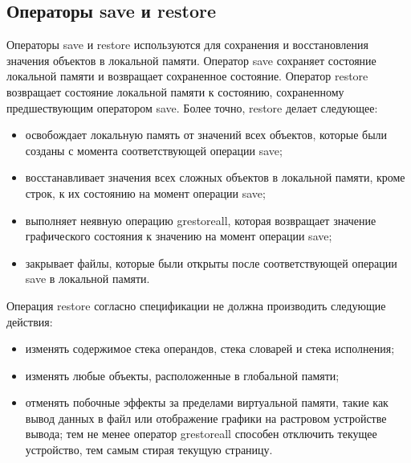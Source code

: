 \subsection{Операторы save и restore}
Операторы save и restore используются для сохранения и восстановления значения объектов в локальной памяти. Оператор save сохраняет состояние локальной памяти и возвращает сохраненное состояние. Оператор restore возвращает состояние локальной памяти к состоянию, сохраненному предшествующим оператором save. Более точно, restore делает следующее:
\begin{itemize}
\item освобождает локальную память от значений всех объектов, которые были созданы с момента соответствующей операции save;
\item восстанавливает значения всех сложных объектов в локальной памяти, кроме строк, к их состоянию на момент операции save;
\item выполняет неявную операцию grestoreall, которая возвращает значение графического состояния к значению на момент операции save;
\item закрывает файлы, которые были открыты после соответствующей операции save в локальной памяти.
\end{itemize}

Операция restore согласно спецификации не должна производить следующие действия:
\begin{itemize}
\item изменять содержимое стека операндов, стека словарей и стека исполнения; 
\item изменять любые объекты, расположенные в глобальной памяти;
\item отменять побочные эффекты за пределами виртуальной памяти, такие как вывод данных в файл или отображение графики на растровом устройстве вывода; тем не менее оператор grestoreall способен отключить текущее устройство, тем самым стирая текущую страницу.
\end{itemize}

